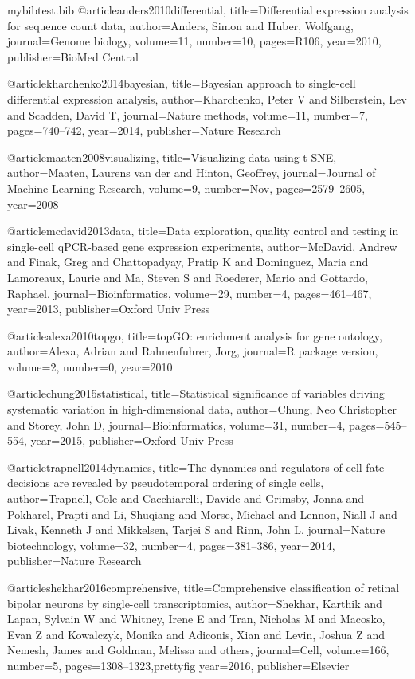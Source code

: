 \begin{filecontents}{mybibtest.bib}
@article{anders2010differential,
  title={Differential expression analysis for sequence count data},
  author={Anders, Simon and Huber, Wolfgang},
  journal={Genome biology},
  volume={11},
  number={10},
  pages={R106},
  year={2010},
  publisher={BioMed Central}
}

@article{kharchenko2014bayesian,
  title={Bayesian approach to single-cell differential expression analysis},
  author={Kharchenko, Peter V and Silberstein, Lev and Scadden, David T},
  journal={Nature methods},
  volume={11},
  number={7},
  pages={740--742},
  year={2014},
  publisher={Nature Research}
}

@article{maaten2008visualizing,
  title={Visualizing data using t-SNE},
  author={Maaten, Laurens van der and Hinton, Geoffrey},
  journal={Journal of Machine Learning Research},
  volume={9},
  number={Nov},
  pages={2579--2605},
  year={2008}
}

@article{mcdavid2013data,
  title={Data exploration, quality control and testing in single-cell qPCR-based gene expression experiments},
  author={McDavid, Andrew and Finak, Greg and Chattopadyay, Pratip K and Dominguez, Maria and Lamoreaux, Laurie and Ma, Steven S and Roederer, Mario and Gottardo, Raphael},
  journal={Bioinformatics},
  volume={29},
  number={4},
  pages={461--467},
  year={2013},
  publisher={Oxford Univ Press}
}

@article{alexa2010topgo,
  title={topGO: enrichment analysis for gene ontology},
  author={Alexa, Adrian and Rahnenfuhrer, Jorg},
  journal={R package version},
  volume={2},
  number={0},
  year={2010}
}	

@article{chung2015statistical,
  title={Statistical significance of variables driving systematic variation in high-dimensional data},
  author={Chung, Neo Christopher and Storey, John D},
  journal={Bioinformatics},
  volume={31},
  number={4},
  pages={545--554},
  year={2015},
  publisher={Oxford Univ Press}
}

@article{trapnell2014dynamics,
  title={The dynamics and regulators of cell fate decisions are revealed by pseudotemporal ordering of single cells},
  author={Trapnell, Cole and Cacchiarelli, Davide and Grimsby, Jonna and Pokharel, Prapti and Li, Shuqiang and Morse, Michael and Lennon, Niall J and Livak, Kenneth J and Mikkelsen, Tarjei S and Rinn, John L},
  journal={Nature biotechnology},
  volume={32},
  number={4},
  pages={381--386},
  year={2014},
  publisher={Nature Research}
}

@article{shekhar2016comprehensive,
  title={Comprehensive classification of retinal bipolar neurons by single-cell transcriptomics},
  author={Shekhar, Karthik and Lapan, Sylvain W and Whitney, Irene E and Tran, Nicholas M and Macosko, Evan Z and Kowalczyk, Monika and Adiconis, Xian and Levin, Joshua Z and Nemesh, James and Goldman, Melissa and others},
  journal={Cell},
  volume={166},
  number={5},
  pages={1308--1323},prettyfig
  year={2016},
  publisher={Elsevier}
}


\end{filecontents}
